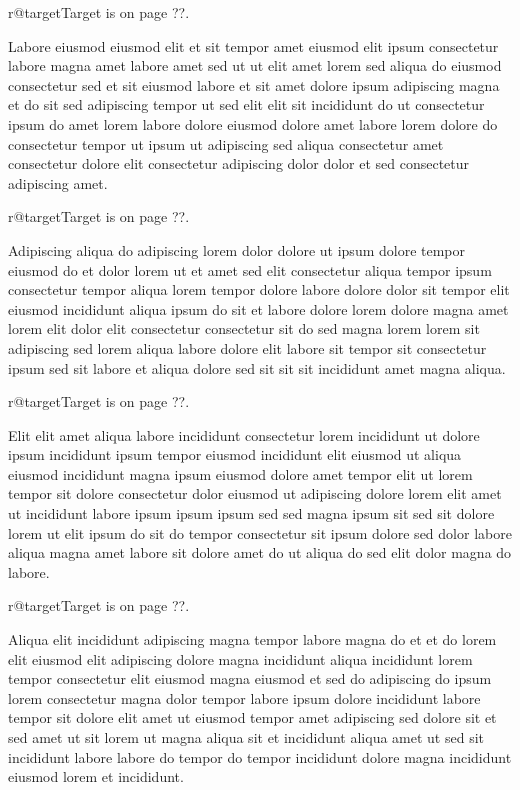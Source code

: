 \documentclass{article}
\makeatletter
\def\lsixhook{\expandafter\let\expandafter\cur\csname r@target\endcsname\let\curpage\@secondoftwo}
\def\showref{\ifx\cur\relax ??\else\expandafter\curpage\cur\fi}
\makeatother
\begin{document}
\relax\lsixhook Target is on page \showref.

Labore eiusmod eiusmod elit et sit tempor amet eiusmod elit ipsum consectetur labore magna amet labore amet sed ut ut elit amet lorem sed aliqua do eiusmod consectetur sed et sit eiusmod labore et sit amet dolore ipsum adipiscing magna et do sit sed adipiscing tempor ut sed elit elit sit incididunt do ut consectetur ipsum do amet lorem labore dolore eiusmod dolore amet labore lorem dolore do consectetur tempor ut ipsum ut adipiscing sed aliqua consectetur amet consectetur dolore elit consectetur adipiscing dolor dolor et sed consectetur adipiscing amet.

\relax\lsixhook Target is on page \showref.

Adipiscing aliqua do adipiscing lorem dolor dolore ut ipsum dolore tempor eiusmod do et dolor lorem ut et amet sed elit consectetur aliqua tempor ipsum consectetur tempor aliqua lorem tempor dolore labore dolore dolor sit tempor elit eiusmod incididunt aliqua ipsum do sit et labore dolore lorem dolore magna amet lorem elit dolor elit consectetur consectetur sit do sed magna lorem lorem sit adipiscing sed lorem aliqua labore dolore elit labore sit tempor sit consectetur ipsum sed sit labore et aliqua dolore sed sit sit sit incididunt amet magna aliqua.

\relax\lsixhook Target is on page \showref.

Elit elit amet aliqua labore incididunt consectetur lorem incididunt ut dolore ipsum incididunt ipsum tempor eiusmod incididunt elit eiusmod ut aliqua eiusmod incididunt magna ipsum eiusmod dolore amet tempor elit ut lorem tempor sit dolore consectetur dolor eiusmod ut adipiscing dolore lorem elit amet ut incididunt labore ipsum ipsum ipsum sed sed magna ipsum sit sed sit dolore lorem ut elit ipsum do sit do tempor consectetur sit ipsum dolore sed dolor labore aliqua magna amet labore sit dolore amet do ut aliqua do sed elit dolor magna do labore.

\relax\lsixhook Target is on page \showref.

Aliqua elit incididunt adipiscing magna tempor labore magna do et et do lorem elit eiusmod elit adipiscing dolore magna incididunt aliqua incididunt lorem tempor consectetur elit eiusmod magna eiusmod et sed do adipiscing do ipsum lorem consectetur magna dolor tempor labore ipsum dolore incididunt labore tempor sit dolore elit amet ut eiusmod tempor amet adipiscing sed dolore sit et sed amet ut sit lorem ut magna aliqua sit et incididunt aliqua amet ut sed sit incididunt labore labore do tempor do tempor incididunt dolore magna incididunt eiusmod lorem et incididunt.
\end{document}
